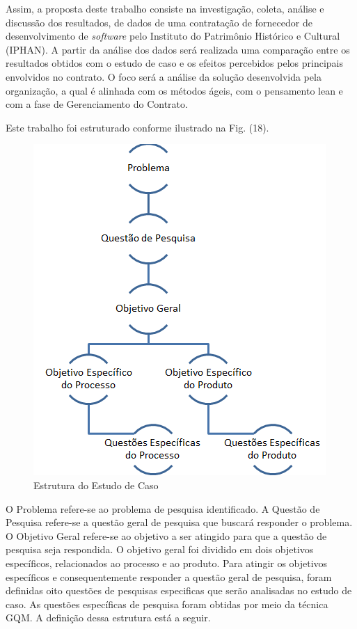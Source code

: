 Assim, a proposta deste trabalho consiste na investigação, coleta, análise e discussão dos resultados, de dados de uma contratação de fornecedor de desenvolvimento de \textit{software} pelo Instituto do Patrimônio Histórico e Cultural (IPHAN). A partir da análise  dos dados será realizada uma comparação entre os resultados obtidos com o estudo de caso e os efeitos percebidos pelos principais envolvidos no contrato. O foco será a análise da solução desenvolvida pela organização, a qual é alinhada com os métodos ágeis, com o pensamento lean e com a fase de Gerenciamento do Contrato.


Este trabalho foi estruturado conforme ilustrado na Fig. (18).

\begin{figure}[htb]
		\centering
		\label{fig01}
			\includegraphics[scale=1.0]{figuras/estruturaEstudo.png}
		\caption{Estrutura do Estudo de Caso}
	\end{figure}

O Problema refere-se ao problema de pesquisa identificado. A Questão de Pesquisa refere-se a questão geral de pesquisa que buscará responder o problema. O Objetivo Geral refere-se ao objetivo a ser atingido para que a questão de pesquisa seja respondida. O objetivo geral foi dividido em dois objetivos específicos, relacionados ao processo e ao produto. Para atingir os objetivos específicos e consequentemente responder a questão geral de pesquisa, foram definidas oito questões de pesquisas especificas que serão analisadas no estudo de caso. As questões específicas de pesquisa foram obtidas por meio da técnica GQM.  A definição dessa estrutura está a seguir.

